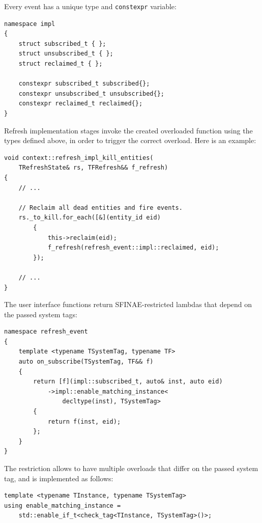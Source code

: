 \documentclass[oneside, 12pt, a4paper, openany]{book}
\begin{document}
Every event has a unique type and
\texttt{constexpr}
variable:

\begin{verbatim}
namespace impl
{
    struct subscribed_t { };
    struct unsubscribed_t { };
    struct reclaimed_t { };

    constexpr subscribed_t subscribed{};
    constexpr unsubscribed_t unsubscribed{};
    constexpr reclaimed_t reclaimed{};
}
\end{verbatim}

Refresh implementation stages invoke the created overloaded function
using the types defined above, in order to trigger the correct overload.
Here is an example:

\begin{verbatim}
void context::refresh_impl_kill_entities(
    TRefreshState& rs, TFRefresh&& f_refresh)
{
    // ...

    // Reclaim all dead entities and fire events.
    rs._to_kill.for_each([&](entity_id eid)
        {
            this->reclaim(eid);
            f_refresh(refresh_event::impl::reclaimed, eid);
        });

    // ...
}

\end{verbatim}

The user interface functions return SFINAE-restricted lambdas that
depend on the passed system tags:

\begin{verbatim}
namespace refresh_event
{
    template <typename TSystemTag, typename TF>
    auto on_subscribe(TSystemTag, TF&& f)
    {
        return [f](impl::subscribed_t, auto& inst, auto eid)
            ->impl::enable_matching_instance<
                decltype(inst), TSystemTag>
        {
            return f(inst, eid);
        };
    }
}
\end{verbatim}

The restriction allows to have multiple overloads that differ on the
passed system tag, and is implemented as follows:

\begin{verbatim}
template <typename TInstance, typename TSystemTag>
using enable_matching_instance =
    std::enable_if_t<check_tag<TInstance, TSystemTag>()>;
\end{verbatim}
\end{document}
